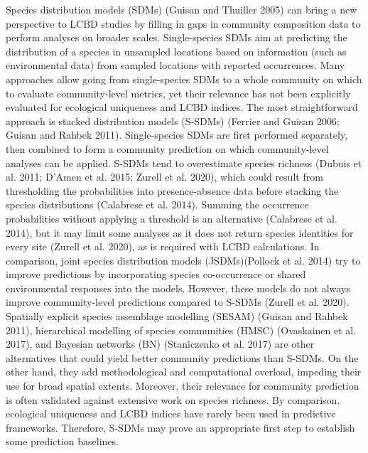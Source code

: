 \documentclass[11pt]{article}
\begin{document}
Species distribution models (SDMs) (Guisan and Thuiller 2005) can bring
a new perspective to LCBD studies by filling in gaps in community
composition data to perform analyses on broader scales. Single-species
SDMs aim at predicting the distribution of a species in unsampled
locations based on information (such as environmental data) from sampled
locations with reported occurrences. Many approaches allow going from
single-species SDMs to a whole community on which to evaluate
community-level metrics, yet their relevance has not been explicitly
evaluated for ecological uniqueness and LCBD indices. The most
straightforward approach is stacked distribution models (S-SDMs)
(Ferrier and Guisan 2006; Guisan and Rahbek 2011). Single-species SDMs
are first performed separately, then combined to form a community
prediction on which community-level analyses can be applied. S-SDMs tend
to overestimate species richness (Dubuis et al. 2011; D'Amen et al.
2015; Zurell et al. 2020), which could result from thresholding the
probabilities into presence-absence data before stacking the species
distributions (Calabrese et al. 2014). Summing the occurrence
probabilities without applying a threshold is an alternative (Calabrese
et al. 2014), but it may limit some analyses as it does not return
species identities for every site (Zurell et al. 2020), as is required
with LCBD calculations. In comparison, joint species distribution models
(JSDMs)(Pollock et al. 2014) try to improve predictions by incorporating
species co-occurrence or shared environmental responses into the models.
However, these models do not always improve community-level predictions
compared to S-SDMs (Zurell et al. 2020). Spatially explicit species
assemblage modelling (SESAM) (Guisan and Rahbek 2011), hierarchical
modelling of species communities (HMSC) (Ovaskainen et al. 2017), and
Bayesian networks (BN) (Staniczenko et al. 2017) are other alternatives
that could yield better community predictions than S-SDMs. On the other
hand, they add methodological and computational overload, impeding their
use for broad spatial extents. Moreover, their relevance for community
prediction is often validated against extensive work on species
richness. By comparison, ecological uniqueness and LCBD indices have
rarely been used in predictive frameworks. Therefore, S-SDMs may prove
an appropriate first step to establish some prediction baselines.
\end{document}

